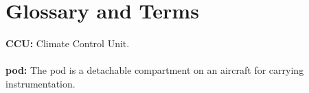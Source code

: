 
\chapter{Glossary and Terms}

\textbf{CCU:} Climate Control Unit.
\\\\
\textbf{pod:} The pod is a detachable compartment on an aircraft for carrying instrumentation.
